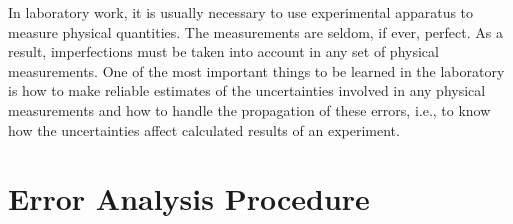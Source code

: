 

In laboratory work, it is usually necessary to use experimental apparatus to measure physical quantities. The measurements are seldom, if ever, perfect. As a result, imperfections must be taken into account in any set of physical measurements. One of the most important things to be learned in the laboratory is how to make reliable estimates of the uncertainties involved in any physical measurements and how to handle the propagation of these errors, i.e., to know how the uncertainties affect calculated results of an experiment.


\section{Error Analysis Procedure}
\label{sec:ErrorProc}

